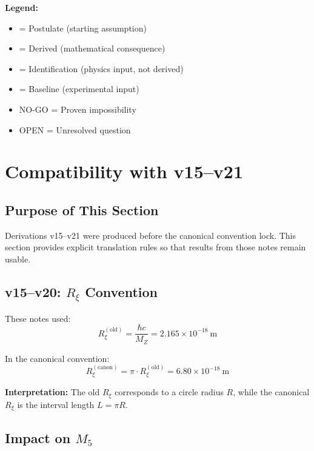 \documentclass[11pt,a4paper]{article}
\newcommand{\Rxi}{R_\xi}
\newcommand{\Mfive}{M_5}
\newcommand{\MZ}{M_Z}
\begin{document}
\begin{tcolorbox}[title=Final Epistemic Ledger, colback=yellow!10, colframe=orange!50]
\textbf{Legend:}
\begin{itemize}
\item [P] = Postulate (starting assumption)
\item [D] = Derived (mathematical consequence)
\item [I] = Identification (physics input, not derived)
\item [BL] = Baseline (experimental input)
\item NO-GO = Proven impossibility
\item OPEN = Unresolved question
\end{itemize}
\end{tcolorbox}

\section{Compatibility with v15--v21}

\subsection{Purpose of This Section}

Derivations v15--v21 were produced before the canonical convention lock. This
section provides explicit translation rules so that results from those notes
remain usable.

\subsection{v15--v20: $\Rxi$ Convention}

These notes used:
\begin{equation}
\Rxi^{\mathrm{(old)}} = \frac{\hbar c}{\MZ} = 2.165 \times 10^{-18}~\mathrm{m}
\label{eq:Rxi-old-value}
\end{equation}

In the canonical convention:
\begin{equation}
\Rxi^{\mathrm{(canon)}} = \pi \cdot \Rxi^{\mathrm{(old)}} = 6.80 \times 10^{-18}~\mathrm{m}
\label{eq:Rxi-canon-value}
\end{equation}

\textbf{Interpretation:} The old $\Rxi$ corresponds to a circle radius $R$, while
the canonical $\Rxi$ is the interval length $L = \pi R$.

\subsection{Impact on $\Mfive$}
\end{document}
